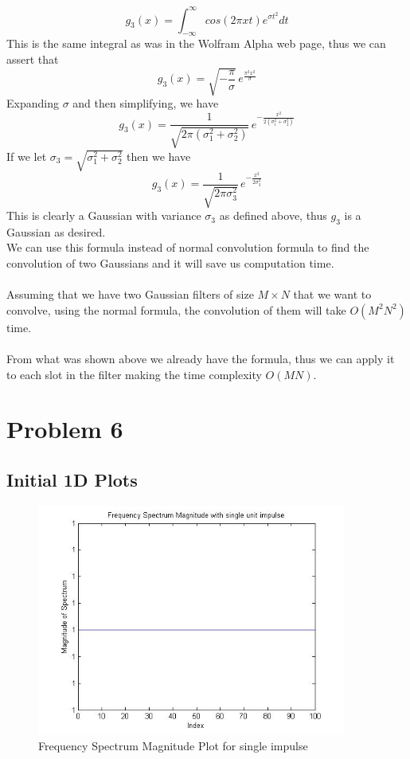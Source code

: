 \documentclass[11pt,psfig]{article}
\begin{document}
\[
g_3(x) = \int_{-\infty}^{\infty} cos(2 \pi x t)e^{\sigma t^2} dt
\]
This is the same integral as was in the Wolfram Alpha web page, thus we can assert that
\[
g_3(x) = \sqrt{-\frac{\pi}{\sigma}} \, e^{\frac{\pi^2 x^2}{\sigma}}
\]
Expanding $\sigma$ and then simplifying, we have
\[
g_3(x) = \frac{1}{\sqrt{2\pi (\sigma_1^2 + \sigma_2^2)}} \, e^{-\frac{x^2}{2(\sigma_1^2 + \sigma_2^2)}}
\]
If we let $\sigma_3 = \sqrt{\sigma_1^2 + \sigma_2^2}$ then we have
\[
g_3(x) = \frac{1}{\sqrt{2\pi \sigma_3^2}} \, e^{-\frac{x^2}{2\sigma_3^2}}
\]
This is clearly a Gaussian with variance $\sigma_3$ as defined above, thus $g_3$ is a Gaussian as desired.\\
\newpage
We can use this formula instead of normal convolution formula to find the convolution of two Gaussians and it will save us computation time. \\
\\
Assuming that we have two Gaussian filters of size $M \times N$ that we want to convolve,
using the normal formula, the convolution of them will take $O(M^2 N^2)$ time. \\
\\
From what was shown above we already have the formula,
thus we can apply it to each slot in the filter making the time complexity $O(MN)$. \\

\newpage

\section*{Problem 6}

\subsection*{Initial 1D Plots}

\begin{figure}[H]
\centering
\includegraphics[height=3in]{prob6plot_freq1.jpg}
\caption{Frequency Spectrum Magnitude Plot for single impulse}
\end{figure}
\end{document}
